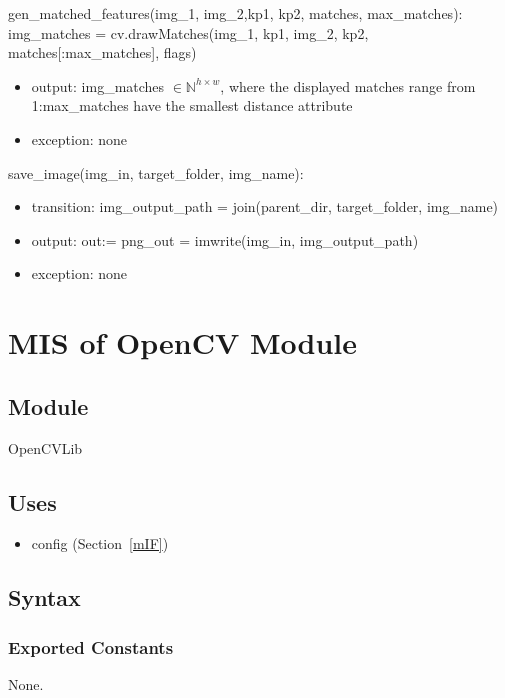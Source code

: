 \documentclass[12pt, titlepage]{article}
\begin{document}
\noindent gen\_matched\_features(img\_1, img\_2,kp1, kp2, matches, max\_matches): \newline 
img\_matches = cv.drawMatches(img\_1, kp1, img\_2, kp2, matches[:max\_matches], 
flags)
\begin{itemize}
  \item output: img\_matches $\in \mathbb{N}^{h \times w}$, where the displayed matches 
  range from 1:max\_matches have the smallest distance attribute
  \item exception: none
\end{itemize}

save\_image(img\_in, target\_folder, img\_name):
\begin{itemize}
  \item transition: img\_output\_path = join(parent\_dir, target\_folder, img\_name)
\end{itemize}

\begin{itemize}
  \item output: out:= png\_out = imwrite(img\_in, img\_output\_path)
  \item exception: none
\end{itemize}




\newpage
\section{MIS of OpenCV Module} \label{mOpenCV}
\subsection{Module}
OpenCVLib

\subsection{Uses}
\begin{itemize}
  \item config (Section~\ref{mIF})
\end{itemize}

\subsection{Syntax}
\subsubsection{Exported Constants}
None.
\end{document}
